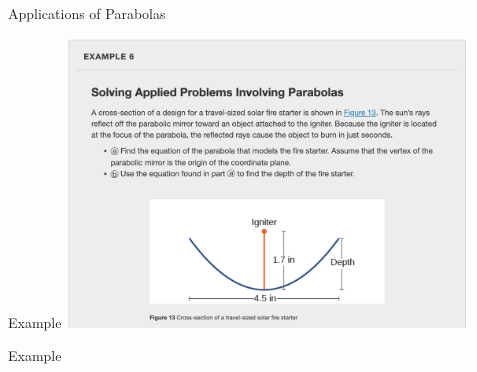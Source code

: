 \documentclass[presentation]{beamer}
\begin{document}
\begin{frame}[label={sec:orgc467322}]{Applications of Parabolas}
\end{frame}

\begin{frame}[label={sec:orgd34c962}]{Example}
\includegraphics[width=0.8\textwidth]{./applied_parab}
\end{frame}

\begin{frame}[label={sec:orga15a791}]{Example}
\end{frame}
\end{document}
